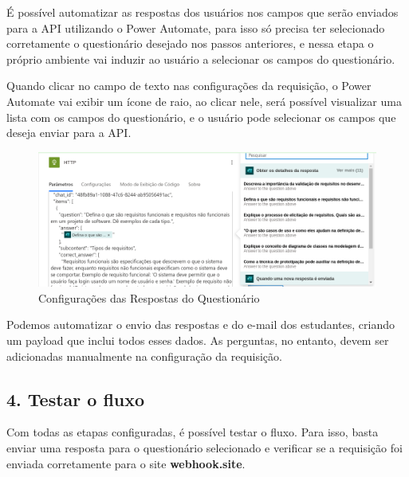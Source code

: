 É possível automatizar as respostas dos usuários nos campos que serão enviados para a API utilizando o Power Automate, para isso só precisa ter selecionado corretamente o questionário desejado nos passos anteriores, e nessa etapa o próprio ambiente vai induzir ao usuário a selecionar os campos do questionário. 

Quando clicar no campo de texto nas configurações da requisição, o Power Automate vai exibir um ícone de raio, ao clicar nele, será possível visualizar uma lista com os campos do questionário, e o usuário pode selecionar os campos que deseja enviar para a API.

\begin{figure}[H]
    \centering
    \includegraphics[width=1\textwidth]{figuras/mpa_example.png}
    \caption{Configurações das Respostas do Questionário}
    \label{fig:report_questions}
\end{figure}

Podemos automatizar o envio das respostas e do e-mail dos estudantes, criando um payload que inclui todos esses dados. As perguntas, no entanto, devem ser adicionadas manualmente na configuração da requisição.

\subsection*{4. Testar o fluxo}

Com todas as etapas configuradas, é possível testar o fluxo. Para isso, basta enviar uma resposta para o questionário selecionado e verificar se a requisição foi enviada corretamente para o site \textbf{webhook.site}.

